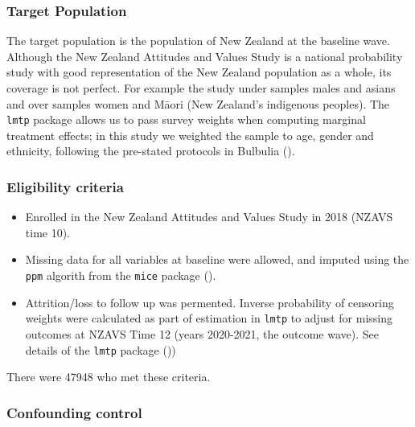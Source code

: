 \documentclass[
  singlecolumn]{article}
\providecommand{\tightlist}{%
  \setlength{\itemsep}{0pt}\setlength{\parskip}{0pt}}\usepackage{longtable,booktabs,array}
\begin{document}
\subsubsection{Target Population}\label{target-population}

The target population is the population of New Zealand at the baseline
wave. Although the New Zealand Attitudes and Values Study is a national
probability study with good representation of the New Zealand population
as a whole, its coverage is not perfect. For example the study under
samples males and asians and over samples women and Māori (New Zealand's
indigenous peoples). The \texttt{lmtp} package allows us to pass survey
weights when computing marginal treatment effects; in this study we
weighted the sample to age, gender and ethnicity, following the
pre-stated protocols in Bulbulia
().

\subsubsection{Eligibility criteria}\label{eligibility-criteria}

\begin{itemize}
\tightlist
\item
  Enrolled in the New Zealand Attitudes and Values Study in 2018 (NZAVS
  time 10).
\item
  Missing data for all variables at baseline were allowed, and imputed
  using the \texttt{ppm} algorith from the \texttt{mice} package
  ().
\item
  Attrition/loss to follow up was permented. Inverse probability of
  censoring weights were calculated as part of estimation in
  \texttt{lmtp} to adjust for missing outcomes at NZAVS Time 12 (years
  2020-2021, the outcome wave). See details of the \texttt{lmtp} package
  ())
\end{itemize}

There were 47948 who met these criteria.

\subsubsection{Confounding control}\label{confounding-control}
\end{document}
